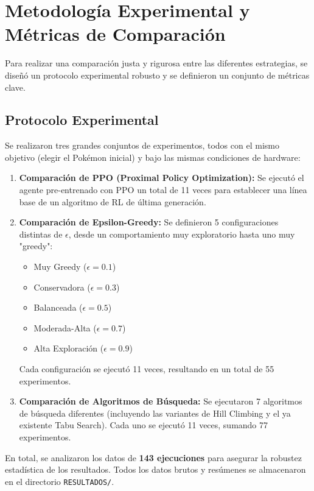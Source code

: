 \documentclass[12pt, oneside, openany]{book}
\begin{document}
\section{Metodología Experimental y Métricas de Comparación}
\label{sec:metodologia}

Para realizar una comparación justa y rigurosa entre las diferentes estrategias, se diseñó un protocolo experimental robusto y se definieron un conjunto de métricas clave.

\subsection{Protocolo Experimental}
Se realizaron tres grandes conjuntos de experimentos, todos con el mismo objetivo (elegir el Pokémon inicial) y bajo las mismas condiciones de hardware:
\begin{enumerate}
    \item \textbf{Comparación de PPO (Proximal Policy Optimization):} Se ejecutó el agente pre-entrenado con PPO un total de 11 veces para establecer una línea base de un algoritmo de RL de última generación.
    \item \textbf{Comparación de Epsilon-Greedy:} Se definieron 5 configuraciones distintas de $\epsilon$, desde un comportamiento muy exploratorio hasta uno muy "greedy":
    \begin{itemize}
        \item Muy Greedy ($\epsilon=0.1$)
        \item Conservadora ($\epsilon=0.3$)
        \item Balanceada ($\epsilon=0.5$)
        \item Moderada-Alta ($\epsilon=0.7$)
        \item Alta Exploración ($\epsilon=0.9$)
    \end{itemize}
    Cada configuración se ejecutó 11 veces, resultando en un total de 55 experimentos.
    \item \textbf{Comparación de Algoritmos de Búsqueda:} Se ejecutaron 7 algoritmos de búsqueda diferentes (incluyendo las variantes de Hill Climbing y el ya existente Tabu Search). Cada uno se ejecutó 11 veces, sumando 77 experimentos.
\end{enumerate}
En total, se analizaron los datos de \textbf{143 ejecuciones} para asegurar la robustez estadística de los resultados. Todos los datos brutos y resúmenes se almacenaron en el directorio \texttt{RESULTADOS/}.
\end{document}
